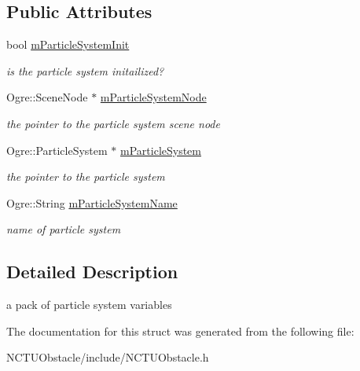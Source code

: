 \subsection*{Public Attributes}
\begin{DoxyCompactItemize}
\item 
bool \hyperlink{struct_n_c_t_u_1_1_particle_system_pack_af7a913d5790d6ad7e5a4cc95f0b990bd}{m\+Particle\+System\+Init}\hypertarget{struct_n_c_t_u_1_1_particle_system_pack_af7a913d5790d6ad7e5a4cc95f0b990bd}{}\label{struct_n_c_t_u_1_1_particle_system_pack_af7a913d5790d6ad7e5a4cc95f0b990bd}

\begin{DoxyCompactList}\small\item\em is the particle system initailized? \end{DoxyCompactList}\item 
Ogre\+::\+Scene\+Node $\ast$ \hyperlink{struct_n_c_t_u_1_1_particle_system_pack_ac49856e3bda9706e29a2631b437683ea}{m\+Particle\+System\+Node}\hypertarget{struct_n_c_t_u_1_1_particle_system_pack_ac49856e3bda9706e29a2631b437683ea}{}\label{struct_n_c_t_u_1_1_particle_system_pack_ac49856e3bda9706e29a2631b437683ea}

\begin{DoxyCompactList}\small\item\em the pointer to the particle system scene node \end{DoxyCompactList}\item 
Ogre\+::\+Particle\+System $\ast$ \hyperlink{struct_n_c_t_u_1_1_particle_system_pack_ab9d8cc21e547221dafc5aafb7c1cc3b3}{m\+Particle\+System}\hypertarget{struct_n_c_t_u_1_1_particle_system_pack_ab9d8cc21e547221dafc5aafb7c1cc3b3}{}\label{struct_n_c_t_u_1_1_particle_system_pack_ab9d8cc21e547221dafc5aafb7c1cc3b3}

\begin{DoxyCompactList}\small\item\em the pointer to the particle system \end{DoxyCompactList}\item 
Ogre\+::\+String \hyperlink{struct_n_c_t_u_1_1_particle_system_pack_ac392bc14df3134eaa6c0a2fe705d80e1}{m\+Particle\+System\+Name}\hypertarget{struct_n_c_t_u_1_1_particle_system_pack_ac392bc14df3134eaa6c0a2fe705d80e1}{}\label{struct_n_c_t_u_1_1_particle_system_pack_ac392bc14df3134eaa6c0a2fe705d80e1}

\begin{DoxyCompactList}\small\item\em name of particle system \end{DoxyCompactList}\end{DoxyCompactItemize}


\subsection{Detailed Description}
a pack of particle system variables 

The documentation for this struct was generated from the following file\+:\begin{DoxyCompactItemize}
\item 
N\+C\+T\+U\+Obstacle/include/N\+C\+T\+U\+Obstacle.\+h\end{DoxyCompactItemize}
